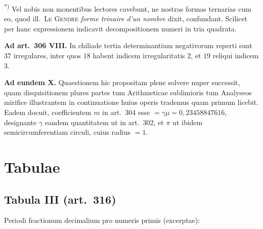 \documentclass[12pt,a4paper]{article}
\theoremstyle{plain}
\theoremstyle{definition}
\theoremstyle{remark}
\begin{document}
\vspace{0.5em}
\noindent\textsuperscript{*)} Vel nobis non monentibus lectores cavebunt, ne nostras formas ternarias cum eo, quod ill.\ \textsc{Le Gendre} \textit{forme trinaire d'un nombre} dixit, confundant. Scilicet per hanc expressionem indicavit decompositionem numeri in tria quadrata.

\vspace{0.5em}
\textbf{Ad art.\ 306 VIII.} In chiliade tertia determinantium negativorum reperti sunt $37$ irregulares, inter quos $18$ habent indicem irregularitatis $2$, et $19$ reliqui indicem $3$.

\vspace{0.5em}
\textbf{Ad eundem X.} Quaestionem hic propositam plene solvere nuper successit, quam disquisitionem plures partes tum Arithmeticae sublimioris tum Analyseos mirifice illustrantem in continuatione huius operis trademus quam primum licebit. Eadem docuit, coefficientem $m$ in art.\ 304 esse $= \gamma\mu = 0{,}23458847616$, designante $\gamma$ eandem quantitatem ut in art.\ 302, et $\pi$ ut ibidem semicircumferentiam circuli, cuius radius $= 1$.


\newpage
\section*{Tabulae}

\subsection*{Tabula III (art.\ 316)}

Periodi fractionum decimalium pro numeris primis (excerptae):
\end{document}
